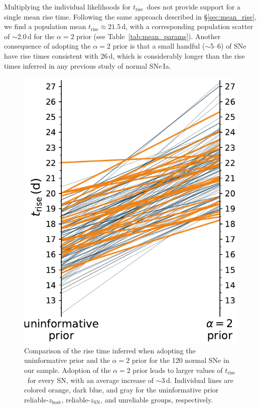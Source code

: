 \documentclass[twocolumn]{./aastex63}
\newcommand{\trise}{$t_\mathrm{rise}$}
\begin{document}
Multiplying the individual likelihoods for \trise\ does not provide support
for a single mean rise time. Following the same approach described in
\S\ref{sec:mean_rise}, we find a population mean \trise\;$\approx 21.5$\,d,
with a corresponding population scatter of $\sim$2.0\,d for the $\alpha = 2$
prior (see Table~\ref{tab:mean_params}). Another consequence of adopting the
$\alpha = 2$ prior is that a small handful ($\sim$5--6) of SNe have rise times
consistent with 26\,d, which is considerably longer than the rise times
inferred in any previous study of normal SNe\,Ia.

\begin{figure}
    \centering
    \includegraphics[width=1\linewidth]{./figures/trise_vs_prior.pdf}
    \caption{Comparison of the rise time inferred when adopting the
    uninformative prior and the $\alpha = 2$ prior for the 120 normal SNe in
    our sample. Adoption of the $\alpha = 2$ prior leads to larger values of
    \trise\ for every SN, with an average increase of $\sim$3\,d. Individual
    lines are colored orange, dark blue, and gray for the uninformative prior
    reliable-$z_\mathrm{host}$, reliable-$z_\mathrm{SN}$, and unreliable
    groups, respectively.}
    \label{fig:trise_prior}
\end{figure}
\end{document}
